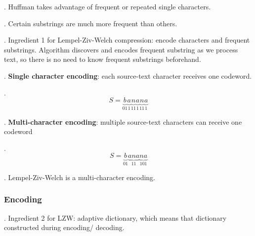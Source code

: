 \documentclass{article}
\begin{document}
\begin{comm}[].
    Huffman takes advantage of frequent or repeated single characters. 
\end{comm}

\begin{discovery}[].
    Certain substrings are much more frequent than others. 
\end{discovery}

\begin{thmm}[].
    Ingredient 1 for Lempel-Ziv-Welch compression: encode characters and frequent substrings. Algorithm discovers and encodes frequent substring as we process text, so there is no need to know frequent substrings beforehand. 
\end{thmm}

\begin{deff}.
    \textbf{Single character encoding}: each source-text character  receives one codeword. 
\end{deff}

\begin{examplee}[].
    \[ S = \underbrace{ b }_{01} \underbrace{ a }_{1} \underbrace{ n }_{11} \underbrace{ a }_{1} \underbrace{ n }_{11} \underbrace{ a }_{1} \]
\end{examplee}

\begin{deff}.
    \textbf{Multi-character encoding}: multiple source-text characters  can receive one codeword
\end{deff}

\begin{examplee}[].
    \[ S = \underbrace{ b }_{01} \underbrace{ ana }_{11} \underbrace{ na }_{101} \]
\end{examplee}

\begin{algo}[].
    Lempel-Ziv-Welch is a multi-character encoding. 
\end{algo}

\subsubsection{Encoding}

\begin{thmm}[].
    Ingredient 2 for LZW: adaptive dictionary, which means that dictionary constructed during encoding/ decoding. 
\end{thmm}
\end{document}
